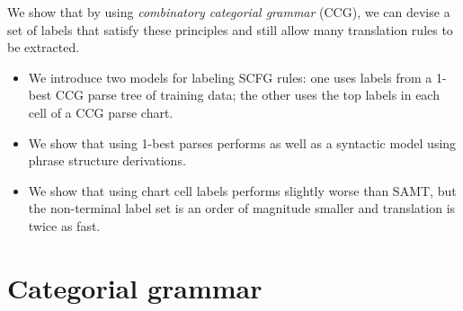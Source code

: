 \documentclass[a4paper]{article}
\begin{document}
We show that by using {\em combinatory categorial grammar} (CCG), we can devise a set of labels that satisfy these principles and still allow many translation rules to be extracted.
\begin{itemize}
\item We introduce two models for labeling SCFG rules: one uses labels from a 1-best CCG parse tree of training data; the other uses the top labels in each cell of a CCG parse chart.
\item We show that using 1-best parses performs as well as a syntactic model using phrase structure derivations.
\item We show that using chart cell labels performs slightly worse than SAMT, but the non-terminal label set is an order of magnitude smaller and translation is twice as fast.
\end{itemize}

\section{Categorial grammar}
\label{sec:cg}






\end{document}
